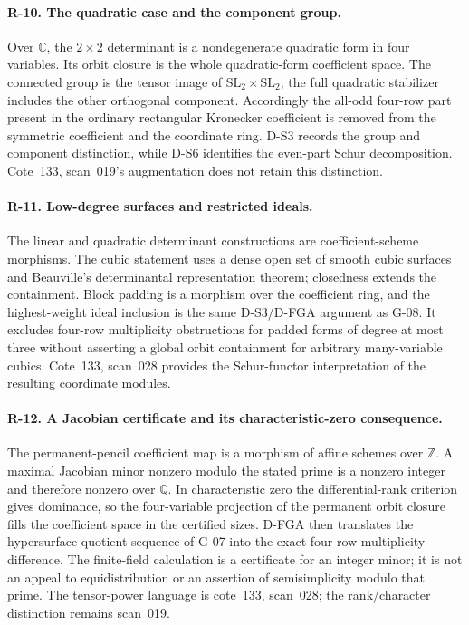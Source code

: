 \paragraph{R-10. The quadratic case and the component group.}
Over $\mathbb C$, the $2\times2$ determinant is a nondegenerate quadratic form in four variables. Its orbit closure is the whole quadratic-form coefficient space. The connected group is the tensor image of $\mathrm{SL}_2\times\mathrm{SL}_2$; the full quadratic stabilizer includes the other orthogonal component. Accordingly the all-odd four-row part present in the ordinary rectangular Kronecker coefficient is removed from the symmetric coefficient and the coordinate ring. D-S3 records the group and component distinction, while D-S6 identifies the even-part Schur decomposition. Cote~133, scan~019's augmentation does not retain this distinction.

\paragraph{R-11. Low-degree surfaces and restricted ideals.}
The linear and quadratic determinant constructions are coefficient-scheme morphisms. The cubic statement uses a dense open set of smooth cubic surfaces and Beauville's determinantal representation theorem; closedness extends the containment. Block padding is a morphism over the coefficient ring, and the highest-weight ideal inclusion is the same D-S3/D-FGA argument as G-08. It excludes four-row multiplicity obstructions for padded forms of degree at most three without asserting a global orbit containment for arbitrary many-variable cubics. Cote~133, scan~028 provides the Schur-functor interpretation of the resulting coordinate modules.

\paragraph{R-12. A Jacobian certificate and its characteristic-zero consequence.}
The permanent-pencil coefficient map is a morphism of affine schemes over $\mathbb Z$. A maximal Jacobian minor nonzero modulo the stated prime is a nonzero integer and therefore nonzero over $\mathbb Q$. In characteristic zero the differential-rank criterion gives dominance, so the four-variable projection of the permanent orbit closure fills the coefficient space in the certified sizes. D-FGA then translates the hypersurface quotient sequence of G-07 into the exact four-row multiplicity difference. The finite-field calculation is a certificate for an integer minor; it is not an appeal to equidistribution or an assertion of semisimplicity modulo that prime. The tensor-power language is cote~133, scan~028; the rank/character distinction remains scan~019.

